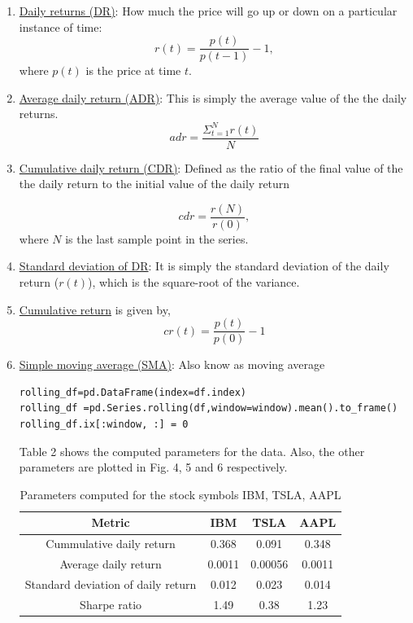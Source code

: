 \documentclass[12pt]{article}
\begin{document}
\begin{enumerate}
 \item \underline{Daily returns (DR)}: How much the price will go up or down on a particular instance of time:
\[ r(t)=\frac{p(t)}{p(t-1)}-1,
\]
where $p(t)$ is the price at time $t$.
\item \underline{Average daily return (ADR)}: This is simply the average value of the the daily returns.
\[ adr = \frac{\Sigma_{t=1}^{N} r(t)}{N}\]

\item \underline {Cumulative daily return (CDR)}: Defined as the ratio of the final value of the the daily return to the initial value of the daily return 

\[ cdr= \frac{r(N)}{r(0)},\] where $N$ is the last sample point in the series.

\item \underline {Standard deviation of DR}: It is simply the standard deviation of the daily return ($r(t)$), which is the square-root of the variance.

\item\underline{Cumulative return} is given by,
\[ cr(t)=\frac{p(t)}{p(0)}-1
\]
\item \underline{Simple moving average (SMA)}: Also know as moving average
  {\small \begin{verbatim}
rolling_df=pd.DataFrame(index=df.index)
rolling_df =pd.Series.rolling(df,window=window).mean().to_frame() 
rolling_df.ix[:window, :] = 0
 \end{verbatim}
}

Table 2 shows the computed parameters for the data. Also, the other parameters are plotted in Fig. 4, 5 and 6 respectively.
\begin{table}
\begin{center}
\begin{tabular} {|c|c|c|c|}
\hline \hline
\textbf{Metric} & \textbf{IBM} & \textbf{TSLA} & \textbf{AAPL} \\ \hline
Cummulative daily return & 0.368 & 0.091 & 0.348 \\ \hline
Average daily return & 0.0011 & 0.00056 & 0.0011\\ \hline
Standard deviation of daily return  & 0.012 & 0.023 & 0.014  \\ \hline
Sharpe ratio & 1.49 & 0.38 & 1.23 \\ \hline
\hline
\end{tabular}
\end{center}
\caption{Parameters computed for the stock symbols IBM, TSLA, AAPL}
\end{table}


\end{enumerate}
\end{document}
